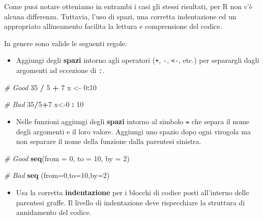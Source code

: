 \documentclass[
]{book}
\newenvironment{Shaded}{\begin{snugshade}}{\end{snugshade}}
\newcommand{\CommentTok}[1]{\textcolor[rgb]{0.56,0.35,0.01}{\textit{#1}}}
\newcommand{\DataTypeTok}[1]{\textcolor[rgb]{0.13,0.29,0.53}{#1}}
\newcommand{\DecValTok}[1]{\textcolor[rgb]{0.00,0.00,0.81}{#1}}
\newcommand{\KeywordTok}[1]{\textcolor[rgb]{0.13,0.29,0.53}{\textbf{#1}}}
\newcommand{\NormalTok}[1]{#1}
\newcommand{\OperatorTok}[1]{\textcolor[rgb]{0.81,0.36,0.00}{\textbf{#1}}}
\newcommand{\StringTok}[1]{\textcolor[rgb]{0.31,0.60,0.02}{#1}}
\providecommand{\tightlist}{%
  \setlength{\itemsep}{0pt}\setlength{\parskip}{0pt}}
\begin{document}
Come puoi notare otteniamo in entrambi i casi gli stessi risultati, per R non c'è alcuna differenza. Tuttavia, l'uso di spazi, una corretta indentazione ed un appropriato allineamento facilita la lettura e comprensione del codice.

In genere sono valide le seguenti regole:

\begin{itemize}
\tightlist
\item
  Aggiungi degli \textbf{spazi} intorno agli operatori (\texttt{+}, \texttt{-}, \texttt{\textless{}-}, etc.) per separargli dagli argomenti ad eccezione di \texttt{:}.
\end{itemize}

\begin{Shaded}
\begin{Highlighting}[]
\CommentTok{# Good}
\DecValTok{35} \OperatorTok{/}\StringTok{ }\DecValTok{5} \OperatorTok{+}\StringTok{ }\DecValTok{7}
\NormalTok{x <-}\StringTok{ }\DecValTok{0}\OperatorTok{:}\DecValTok{10}

\CommentTok{# Bad}
\DecValTok{35}\OperatorTok{/}\DecValTok{5}\OperatorTok{+}\DecValTok{7}
\NormalTok{x<-}\DecValTok{0} \OperatorTok{:}\StringTok{ }\DecValTok{10}
\end{Highlighting}
\end{Shaded}

\begin{itemize}
\tightlist
\item
  Nelle funzioni aggiungi degli \textbf{spazi} intorno al simbolo \texttt{=} che separa il nome degli argomenti e il loro valore. Aggiungi uno spazio dopo ogni virogola ma non separare il nome della funzione dalla parentesi sinistra.
\end{itemize}

\begin{Shaded}
\begin{Highlighting}[]
\CommentTok{# Good}
\KeywordTok{seq}\NormalTok{(}\DataTypeTok{from =} \DecValTok{0}\NormalTok{, }\DataTypeTok{to =} \DecValTok{10}\NormalTok{, }\DataTypeTok{by =} \DecValTok{2}\NormalTok{)}

\CommentTok{# Bad}
\KeywordTok{seq}\NormalTok{ (}\DataTypeTok{from=}\DecValTok{0}\NormalTok{,}\DataTypeTok{to=}\DecValTok{10}\NormalTok{,}\DataTypeTok{by=}\DecValTok{2}\NormalTok{)}
\end{Highlighting}
\end{Shaded}

\begin{itemize}
\tightlist
\item
  Usa la corretta \textbf{indentazione} per i blocchi di codice posti all'interno delle parentesi graffe. Il livello di indentazione deve rispecchiare la struttura di annidamento del codice.
\end{itemize}
\end{document}
